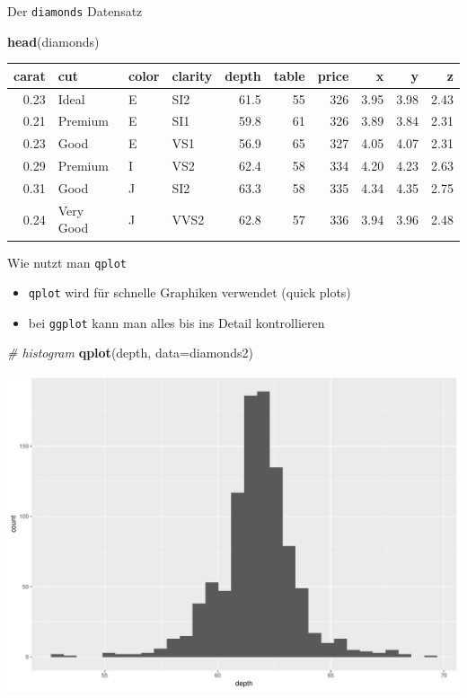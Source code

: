 \documentclass[ignorenonframetext,]{beamer}
\newenvironment{Shaded}{}{}
\newcommand{\KeywordTok}[1]{\textcolor[rgb]{0.00,0.44,0.13}{\textbf{{#1}}}}
\newcommand{\DataTypeTok}[1]{\textcolor[rgb]{0.56,0.13,0.00}{{#1}}}
\newcommand{\CommentTok}[1]{\textcolor[rgb]{0.38,0.63,0.69}{\textit{{#1}}}}
\newcommand{\NormalTok}[1]{{#1}}
\providecommand{\tightlist}{%
\setlength{\itemsep}{0pt}\setlength{\parskip}{0pt}}
\begin{document}
\begin{frame}[fragile]{Der \texttt{diamonds} Datensatz}

\begin{Shaded}
\begin{Highlighting}[]
\KeywordTok{head}\NormalTok{(diamonds)}
\end{Highlighting}
\end{Shaded}

\begin{longtable}[]{@{}rlllrrrrrr@{}}
\toprule
carat & cut & color & clarity & depth & table & price & x & y &
z\tabularnewline
\midrule
\endhead
0.23 & Ideal & E & SI2 & 61.5 & 55 & 326 & 3.95 & 3.98 &
2.43\tabularnewline
0.21 & Premium & E & SI1 & 59.8 & 61 & 326 & 3.89 & 3.84 &
2.31\tabularnewline
0.23 & Good & E & VS1 & 56.9 & 65 & 327 & 4.05 & 4.07 &
2.31\tabularnewline
0.29 & Premium & I & VS2 & 62.4 & 58 & 334 & 4.20 & 4.23 &
2.63\tabularnewline
0.31 & Good & J & SI2 & 63.3 & 58 & 335 & 4.34 & 4.35 &
2.75\tabularnewline
0.24 & Very Good & J & VVS2 & 62.8 & 57 & 336 & 3.94 & 3.96 &
2.48\tabularnewline
\bottomrule
\end{longtable}

\end{frame}

\begin{frame}[fragile]{Wie nutzt man \texttt{qplot}}

\begin{itemize}
\tightlist
\item
  \texttt{qplot} wird für schnelle Graphiken verwendet (quick plots)
\item
  bei \texttt{ggplot} kann man alles bis ins Detail kontrollieren
\end{itemize}

\begin{Shaded}
\begin{Highlighting}[]
\CommentTok{# histogram}
\KeywordTok{qplot}\NormalTok{(depth, }\DataTypeTok{data=}\NormalTok{diamonds2)}
\end{Highlighting}
\end{Shaded}

\includegraphics{RSocialScience2_files/figure-beamer/unnamed-chunk-10-1.pdf}

\end{frame}
\end{document}
